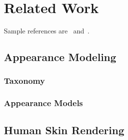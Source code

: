 \setcounter{chapter}{1}

\chapter{Related Work}

Sample references are~\cite{Zwicker04Perspective} and~\cite{Altman89QuaternionScandal}.

\section{Appearance Modeling}



\subsection{Taxonomy}


\subsection{Appearance Models}

\section{Human Skin Rendering}

